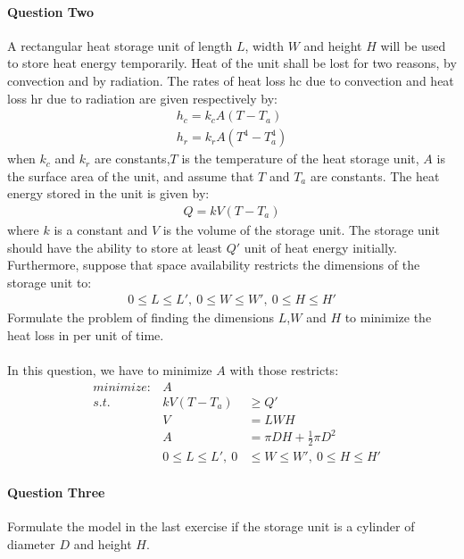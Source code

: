 \documentclass[11pt]{article}
\begin{document}
\paragraph{Question Two}
  A rectangular heat storage unit of length $L$, width $W$ and height $H$ will be
  used to store heat energy temporarily. Heat of the unit shall be lost for two
  reasons, by convection and by radiation. The rates of heat loss hc due to
  convection and heat loss hr due to radiation are given respectively by:
  \begin{align*}
    h_c = k_c A(T-T_a) \\
    h_r = k_r A(T^4 - T^4_a)
  \end{align*}
  when $k_c$ and $k_r$ are constants,$T$ is the temperature of the heat storage
  unit, $A$ is the surface area of the unit, and assume that $T$ and $T_a$ are
  constants. The heat energy stored in the unit is given by:
  \begin{align*}
    Q = kV(T - T_a)
  \end{align*}
  where $k$ is a constant and $V$ is the volume of the storage unit. The storage
  unit should have the ability to store at least $Q'$ unit of heat energy
  initially. Furthermore, suppose that space availability restricts the
  dimensions of the storage unit to:
  \begin{align*}
    0 \leq L \leq L', \ 0 \leq W \leq W', \ 0 \leq H \leq H'
  \end{align*}
  Formulate the problem of finding the dimensions $L$,$W$ and $H$ to minimize
  the heat loss in per unit of time.
\paragraph{\color{red}{Answer:}}
In this question, we have to minimize $A$ with those restricts:
\begin{align*}
  &minimize: &A  \\
  &s.t.      &kV(T - T_a) &\geq Q' \\
  &          &V &= LWH \\
  &          &A &= \pi DH + \frac{1}{2}\pi D^2 \\
  &          &0 \leq L \leq L', \ 0 &\leq W \leq W', \ 0 \leq H \leq H'
\end{align*}

\paragraph{Question Three}
Formulate the model in the last exercise if the storage unit is a cylinder of
diameter $D$ and height $H$.
\end{document}
